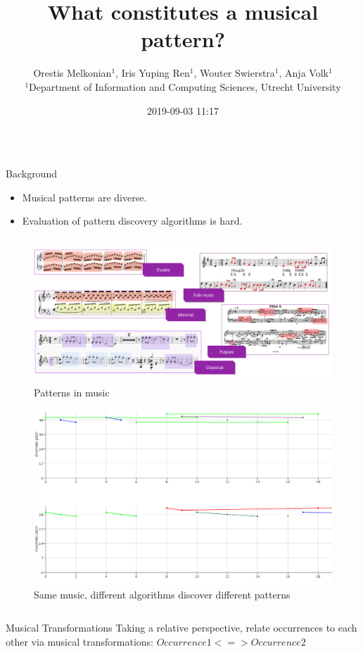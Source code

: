 \documentclass[final]{beamer}
\date{}
\author{
Orestis Melkonian$^{1}$, Iris Yuping Ren$^{1}$, Wouter Swierstra$^{1}$, Anja Volk$^{1}$
\\
\vspace{5mm}
\normalsize{$^{1}$Department of Information and Computing Sciences,}
\normalsize{Utrecht University}
}
\date{2019-09-03 11:17}
\title{What constitutes a musical pattern?}
\begin{document}
\begin{frame}[label={sec:orgd59d0ad},fragile]{}
 \vspace{-2cm}
\begin{columns}
\begin{column}[t]{0.47\columnwidth}
\begin{block}{Background}
\begin{itemize}
\item Musical patterns are diverse.
\item Evaluation of pattern discovery algorithms is hard.
\end{itemize}

\begin{columns}
\begin{column}[T]{0.90\columnwidth}
\begin{figure}[htbp]
\centering
\includegraphics[width=.9\linewidth]{img/examples.png}
\caption{\label{fig:orgd0df8ba}
Patterns in music}
\end{figure}


\begin{figure}[htbp]
\centering
\includegraphics[width=.9\linewidth]{img/alg.png}
\caption{\label{fig:orgf369048}
Same music, different algorithms discover different patterns}
\end{figure}
\end{column}
\end{columns}
\end{block}
\begin{block}{Musical Transformations}
Taking a relative perspective, relate occurrences to each other via musical transformations: 
\(Occurrence 1 <=> Occurrence 2\)


\end{block}
\end{column}
\end{columns}
\end{frame}
\end{document}
